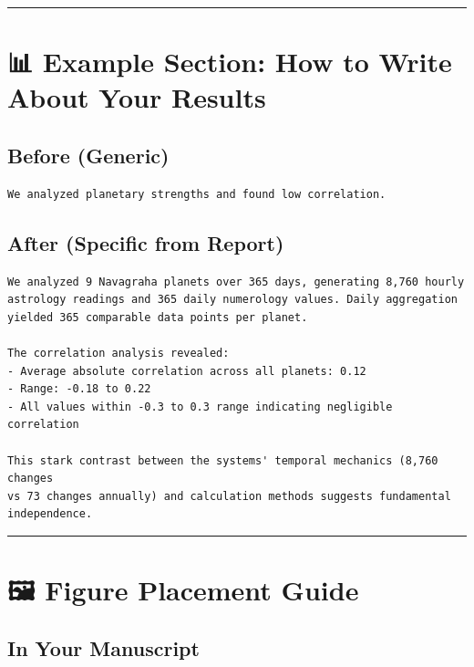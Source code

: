 \documentclass[
  11pt,
  oneside,
  openany]{scrbook}
\begin{document}
\begin{center}\rule{0.5\linewidth}{0.5pt}\end{center}

\section{📊 Example Section: How to Write About Your
Results}\label{example-section-how-to-write-about-your-results}

\subsection{Before (Generic)}\label{before-generic}

\begin{verbatim}
We analyzed planetary strengths and found low correlation.
\end{verbatim}

\subsection{After (Specific from
Report)}\label{after-specific-from-report}

\begin{verbatim}
We analyzed 9 Navagraha planets over 365 days, generating 8,760 hourly
astrology readings and 365 daily numerology values. Daily aggregation
yielded 365 comparable data points per planet.

The correlation analysis revealed:
- Average absolute correlation across all planets: 0.12
- Range: -0.18 to 0.22
- All values within -0.3 to 0.3 range indicating negligible correlation

This stark contrast between the systems' temporal mechanics (8,760 changes
vs 73 changes annually) and calculation methods suggests fundamental independence.
\end{verbatim}

\begin{center}\rule{0.5\linewidth}{0.5pt}\end{center}

\section{🖼️ Figure Placement Guide}\label{figure-placement-guide}

\subsection{In Your Manuscript}\label{in-your-manuscript}
\end{document}
